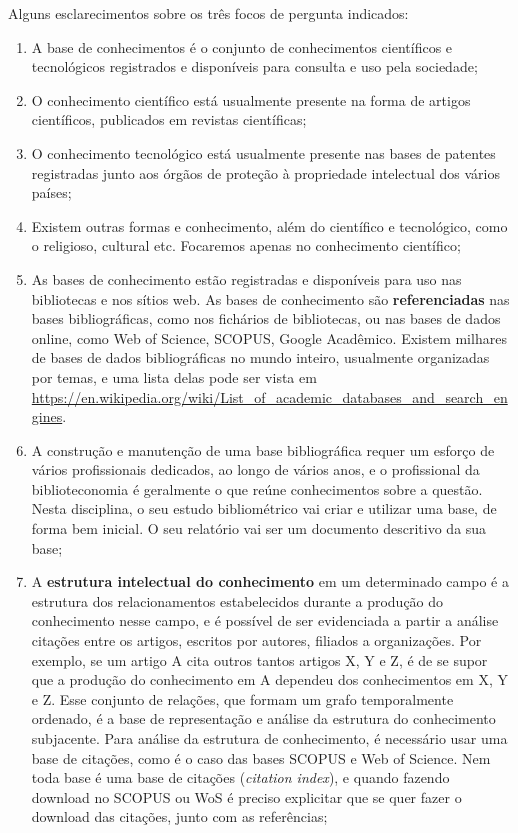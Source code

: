 Alguns esclarecimentos sobre os três focos de pergunta indicados:
\begin{enumerate}
    \item A base de conhecimentos é o conjunto de conhecimentos científicos e tecnológicos registrados e disponíveis para consulta e uso pela sociedade;
    \item O conhecimento científico está usualmente presente na forma de artigos científicos, publicados em revistas científicas;
    \item O conhecimento tecnológico está usualmente presente nas bases de patentes registradas junto aos órgãos de proteção à propriedade intelectual dos vários países;
    \item Existem outras formas e conhecimento, além do científico e tecnológico, como o religioso, cultural etc. Focaremos apenas no conhecimento científico;
    \item As bases de conhecimento estão registradas e disponíveis para uso nas bibliotecas e nos sítios web. As bases de conhecimento são \textbf{referenciadas} nas bases bibliográficas, como nos fichários de bibliotecas, ou nas bases de dados online, como Web of Science, SCOPUS, Google Acadêmico. Existem milhares de bases de dados bibliográficas no mundo inteiro, usualmente organizadas por temas, e uma lista delas pode ser vista em \url{https://en.wikipedia.org/wiki/List_of_academic_databases_and_search_engines}. 
    \item A construção e manutenção de uma base bibliográfica requer um esforço de vários profissionais dedicados, ao longo de vários anos, e o profissional da biblioteconomia é geralmente o que reúne conhecimentos sobre a questão. Nesta disciplina, o seu estudo bibliométrico vai criar e utilizar uma base, de forma bem inicial. O seu relatório vai ser um documento descritivo da sua base;
    \item A \textbf{estrutura intelectual do conhecimento} em um determinado campo é a estrutura dos relacionamentos estabelecidos durante a produção do conhecimento nesse campo, e é possível de ser evidenciada a partir a análise citações entre os artigos, escritos por autores, filiados a organizações. Por exemplo, se um artigo A cita outros tantos artigos X, Y e Z, é de se supor que a produção do conhecimento em A dependeu dos conhecimentos em X, Y e Z. Esse conjunto de relações, que formam um grafo temporalmente ordenado, é a base de representação e análise da estrutura do conhecimento subjacente. Para análise da estrutura de conhecimento, é necessário usar uma base de citações, como é o caso das bases SCOPUS e Web of Science. Nem toda base é uma base de citações (\textit{citation index}), e quando fazendo download no SCOPUS ou WoS é preciso explicitar que se quer fazer o download das citações, junto com as referências;

\end{enumerate}
